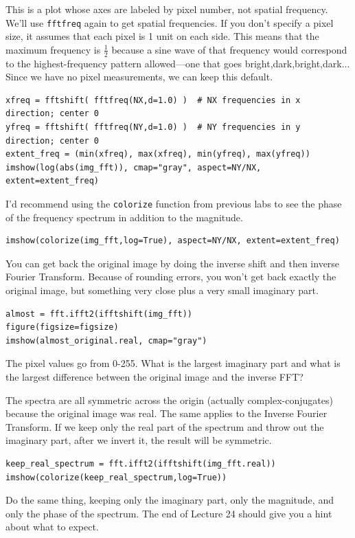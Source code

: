 \documentclass[11pt]{hmcpset}
\begin{document}
\begin{problem}
This is a plot whose axes are labeled by pixel number, not spatial frequency. We'll use \texttt{fftfreq} again to get spatial frequencies. If you don't specify a pixel size, it assumes that each pixel is 1 unit on each side. This means that the maximum frequency is $\tfrac{1}{2}$ because a sine wave of that frequency would correspond to the highest-frequency pattern allowed---one that goes bright,dark,bright,dark... Since we have no pixel measurements, we can keep this default.
\begin{lstlisting}[style=Python]
xfreq = fftshift( fftfreq(NX,d=1.0) )  # NX frequencies in x direction; center 0
yfreq = fftshift( fftfreq(NY,d=1.0) )  # NY frequencies in y direction; center 0
extent_freq = (min(xfreq), max(xfreq), min(yfreq), max(yfreq))
imshow(log(abs(img_fft)), cmap="gray", aspect=NY/NX, extent=extent_freq)
\end{lstlisting}
I'd recommend using the \texttt{colorize} function from previous labs to see the phase of the frequency spectrum in addition to the magnitude.
\begin{lstlisting}[style=Python]
imshow(colorize(img_fft,log=True), aspect=NY/NX, extent=extent_freq)
\end{lstlisting}
You can get back the original image by doing the inverse shift and then inverse Fourier Transform. Because of rounding errors, you won't get back exactly the original image, but something very close plus a very small imaginary part. 
\begin{lstlisting}[style=Python]
almost = fft.ifft2(ifftshift(img_fft))
figure(figsize=figsize)
imshow(almost_original.real, cmap="gray")
\end{lstlisting}
The pixel values go from 0-255. What is the largest imaginary part and what is the largest difference between the original image and the inverse FFT?

The spectra are all symmetric across the origin (actually complex-conjugates) because the original image was real. The same applies to the Inverse Fourier Transform. If we keep only the real part of the spectrum and throw out the imaginary part, after we invert it, the result will be symmetric.
\begin{lstlisting}[style=Python]
keep_real_spectrum = fft.ifft2(ifftshift(img_fft.real))
imshow(colorize(keep_real_spectrum,log=True))
\end{lstlisting}
Do the same thing, keeping only the imaginary part, only the magnitude, and only the phase of the spectrum. The end of Lecture 24 should give you a hint about what to expect.

\end{problem}
\pagebreak
\end{document}
